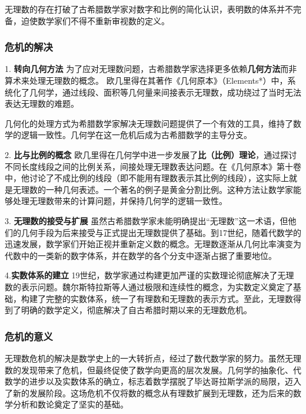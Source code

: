 无理数的存在打破了古希腊数学家对数字和比例的简化认识，表明数的体系并不完备，迫使数学家们不得不重新审视数的定义。

\subsubsection{危机的解决}
1. {\bf 转向几何方法}
为了应对无理数问题，古希腊数学家选择更多依赖{\bf 几何方法}而非算术来处理无理数的概念。
欧几里得在其著作《几何原本》（Elements*）中，系统化了几何学，通过线段、面积等几何量来间接表示无理数，成功绕过了当时无法表达无理数的难题。

几何化的处理方式为希腊数学家解决无理数问题提供了一个有效的工具，维持了数学的逻辑一致性。几何学在这一危机后成为古希腊数学的主导分支。

2. {\bf 比与比例的概念}
欧几里得在几何学中进一步发展了{\bf 比（比例）理论}，通过探讨不同长度线段之间的比例关系，间接处理无理数表达问题。在《几何原本》第十卷中，他讨论了不成比例的线段（即不能用有理数表示其比例的线段），这实际上就是无理数的一种几何表述。一个著名的例子是黄金分割比例。这种方法让数学家能够处理无理数带来的计算问题，并保持几何学的逻辑一致性。

3. {\bf 无理数的接受与扩展}
虽然古希腊数学家未能明确提出“无理数”这一术语，但他们的几何手段为后来接受与正式提出无理数提供了基础。到17世纪，随着代数学的迅速发展，数学家们开始正视并重新定义数的概念。无理数逐渐从几何比率演变为代数中的一类新的数字体系，并在数学的各个分支中逐渐占据了重要地位。

4.{\bf 实数体系的建立}
19世纪，数学家通过构建更加严谨的实数理论彻底解决了无理数的表示问题。魏尔斯特拉斯等人通过极限和连续性的概念，为实数定义奠定了基础，构建了完整的实数体系，统一了有理数和无理数的表示方式。至此，无理数得到了明确的数学定义，彻底解决了自古希腊时期以来的无理数危机。

\subsubsection{危机的意义}
无理数危机的解决是数学史上的一大转折点，经过了数代数学家的努力。虽然无理数的发现带来了危机，但最终促使了数学向更高的层次发展。几何学的抽象化、代数学的进步以及实数体系的确立，标志着数学摆脱了毕达哥拉斯学派的局限，迈入了新的发展阶段。这场危机不仅将数的概念从有理数扩展到无理数，还为后来的数学分析和数论奠定了坚实的基础。

